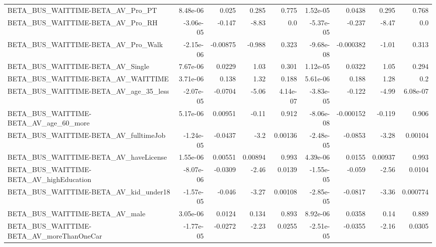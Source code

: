 \begin{tabular}{lrrrrrrrr}
BETA\_BUS\_WAITTIME-BETA\_AV\_Pro\_PT                   &    8.48e-06 &        0.025 &     0.285 &    0.775 &   1.52e-05 &      0.0438 &        0.295 &         0.768 \\
BETA\_BUS\_WAITTIME-BETA\_AV\_Pro\_RH                   &   -3.06e-05 &       -0.147 &     -8.83 &      0.0 &  -5.37e-05 &      -0.237 &        -8.47 &           0.0 \\
BETA\_BUS\_WAITTIME-BETA\_AV\_Pro\_Walk                 &   -2.15e-06 &     -0.00875 &    -0.988 &    0.323 &  -9.68e-08 &   -0.000382 &        -1.01 &         0.313 \\
BETA\_BUS\_WAITTIME-BETA\_AV\_Single                   &    7.67e-06 &       0.0229 &      1.03 &    0.301 &   1.12e-05 &      0.0322 &         1.05 &         0.294 \\
BETA\_BUS\_WAITTIME-BETA\_AV\_WAITTIME                 &    3.71e-06 &        0.138 &      1.32 &    0.188 &   5.61e-06 &       0.188 &         1.28 &           0.2 \\
BETA\_BUS\_WAITTIME-BETA\_AV\_age\_35\_less              &   -2.07e-05 &      -0.0704 &     -5.06 & 4.14e-07 &  -3.83e-05 &      -0.122 &        -4.99 &      6.08e-07 \\
BETA\_BUS\_WAITTIME-BETA\_AV\_age\_60\_more              &    5.17e-06 &      0.00951 &     -0.11 &    0.912 &  -8.06e-08 &   -0.000152 &       -0.119 &         0.906 \\
BETA\_BUS\_WAITTIME-BETA\_AV\_fulltimeJob              &   -1.24e-05 &      -0.0437 &      -3.2 &  0.00136 &  -2.48e-05 &     -0.0853 &        -3.28 &       0.00104 \\
BETA\_BUS\_WAITTIME-BETA\_AV\_haveLicense              &    1.55e-06 &      0.00551 &   0.00894 &    0.993 &   4.39e-06 &      0.0155 &      0.00937 &         0.993 \\
BETA\_BUS\_WAITTIME-BETA\_AV\_highEducation            &   -8.07e-06 &      -0.0309 &     -2.46 &   0.0139 &  -1.55e-05 &      -0.059 &        -2.56 &        0.0104 \\
BETA\_BUS\_WAITTIME-BETA\_AV\_kid\_under18              &   -1.57e-05 &       -0.046 &     -3.27 &  0.00108 &  -2.85e-05 &     -0.0817 &        -3.36 &      0.000774 \\
BETA\_BUS\_WAITTIME-BETA\_AV\_male                     &    3.05e-06 &       0.0124 &     0.134 &    0.893 &   8.92e-06 &      0.0358 &         0.14 &         0.889 \\
BETA\_BUS\_WAITTIME-BETA\_AV\_moreThanOneCar           &   -1.77e-05 &      -0.0272 &     -2.23 &   0.0255 &  -2.51e-05 &     -0.0355 &        -2.16 &        0.0305 \\

\end{tabular}
